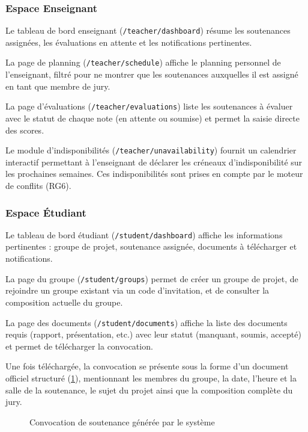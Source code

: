 \subsubsection{Espace Enseignant}
\label{ch4:features_teacher}

Le tableau de bord enseignant (\texttt{/teacher/dashboard}) résume les soutenances assignées, les évaluations en attente et les notifications pertinentes.

La page de planning (\texttt{/teacher/schedule}) affiche le planning personnel de l'enseignant, filtré pour ne montrer que les soutenances auxquelles il est assigné en tant que membre de jury.

La page d'évaluations (\texttt{/teacher/evaluations}) liste les soutenances à évaluer avec le statut de chaque note (en attente ou soumise) et permet la saisie directe des scores.

Le module d'indisponibilités (\texttt{/teacher/unavailability}) fournit un calendrier interactif permettant à l'enseignant de déclarer les créneaux d'indisponibilité sur les prochaines semaines. Ces indisponibilités sont prises en compte par le moteur de conflits (RG6).

\subsubsection{Espace Étudiant}
\label{ch4:features_student}

Le tableau de bord étudiant (\texttt{/student/dashboard}) affiche les informations pertinentes : groupe de projet, soutenance assignée, documents à télécharger et notifications.

La page du groupe (\texttt{/student/groups}) permet de créer un groupe de projet, de rejoindre un groupe existant via un code d'invitation, et de consulter la composition actuelle du groupe.

La page des documents (\texttt{/student/documents}) affiche la liste des documents requis (rapport, présentation, etc.) avec leur statut (manquant, soumis, accepté) et permet de télécharger la convocation.

Une fois téléchargée, la convocation se présente sous la forme d'un document officiel structuré (\cref{fig:convocation}), mentionnant les membres du groupe, la date, l'heure et la salle de la soutenance, le sujet du projet ainsi que la composition complète du jury.

\begin{figure}[H]
    \centering
    \caption{Convocation de soutenance générée par le système}
    \label{fig:convocation}
\end{figure}

